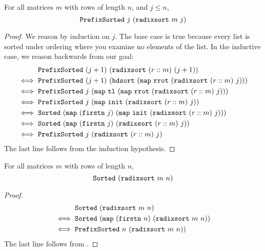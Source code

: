 \documentclass[sigplan,10pt,anonymous,review]{thesis}
\begin{document}
\begin{lemma}
  For all matrices $m$ with rows of length $n$, and $j \le n$,
  \begin{equation*}
    \texttt{PrefixSorted}~j~(\texttt{radixsort}~m~j)
  \end{equation*}
\end{lemma}
\begin{proof}
  We reason by induction on $j$. The base case is true because every
  list is sorted under ordering where you examine no elements of the
  list. In the inductive case, we reason backwards from our goal:
  \begin{align*}
       &\texttt{PrefixSorted}~(j+1)~(\texttt{radixsort}~(r :: m)~(j+1)) \\
    \iff{}&\texttt{PrefixSorted}~(j+1)~(\texttt{hdsort}~(\texttt{map}~\texttt{rrot}~(\texttt{radixsort}~(r :: m)~j))) \\
    \iff{}&\texttt{PrefixSorted}~j~(\texttt{map}~\texttt{tl}~(\texttt{map}~\texttt{rrot}~(\texttt{radixsort}~(r :: m)~j))) \\
    \iff{}&\texttt{PrefixSorted}~j~(\texttt{map}~\texttt{init}~(\texttt{radixsort}~(r :: m)~j)) \\
    \iff{}&\texttt{Sorted}~(\texttt{map}~(\texttt{firstn}~j)~(\texttt{map}~\texttt{init}~(\texttt{radixsort}~(r :: m)~j))) \\
    \iff{}&\texttt{Sorted}~(\texttt{map}~(\texttt{firstn}~j)~(\texttt{radixsort}~(r :: m)~j)) \\
    \iff{}&\texttt{PrefixSorted}~j~(\texttt{radixsort}~(r :: m)~j)
  \end{align*}
  The last line follows from the induction hypothesis.
\end{proof}

\begin{theorem}
  For all matrices $m$ with rows of length $n$,
  \begin{equation*}
      \texttt{Sorted}~(\texttt{radixsort}~m~n)
  \end{equation*}
\end{theorem}
\begin{proof}
  \begin{align*}
      &\texttt{Sorted}~(\texttt{radixsort}~m~n) \\
    \iff{}&\texttt{Sorted}~(\texttt{map}~(\texttt{firstn}~n)~(\texttt{radixsort}~m~n)) \\
    \iff{}&\texttt{PrefixSorted}~n~(\texttt{radixsort}~m~n))
  \end{align*}
  The last line follows from .
\end{proof}
\end{document}
